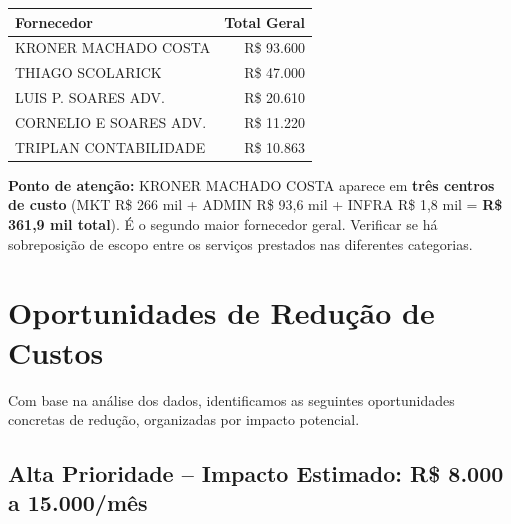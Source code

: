 \documentclass[12pt, a4paper]{article}
\newcommand{\reais}[1]{R\$ #1}
\begin{document}
\begin{table}[H]
    \centering
    \small
    \renewcommand{\arraystretch}{1.3}
    \begin{tabularx}{\textwidth}{X r}
        \toprule
        \rowcolor{tableHeader} \textbf{Fornecedor} & \textbf{Total Geral} \\
        \midrule
        KRONER MACHADO COSTA & \reais{93.600} \\
        THIAGO SCOLARICK & \reais{47.000} \\
        LUIS P. SOARES ADV. & \reais{20.610} \\
        CORNELIO E SOARES ADV. & \reais{11.220} \\
        TRIPLAN CONTABILIDADE & \reais{10.863} \\
        \bottomrule
    \end{tabularx}
\end{table}

\textcolor{warningOrange}{\textbf{Ponto de atenção:}} KRONER MACHADO COSTA aparece em \textbf{três centros de custo} (MKT R\$ 266 mil + ADMIN R\$ 93,6 mil + INFRA R\$ 1,8 mil = \textbf{R\$ 361,9 mil total}). É o segundo maior fornecedor geral. Verificar se há sobreposição de escopo entre os serviços prestados nas diferentes categorias.

\newpage
\section{Oportunidades de Redução de Custos}

Com base na análise dos dados, identificamos as seguintes oportunidades concretas de redução, organizadas por impacto potencial.

\subsection{Alta Prioridade -- Impacto Estimado: R\$ 8.000 a 15.000/mês}
\end{document}
